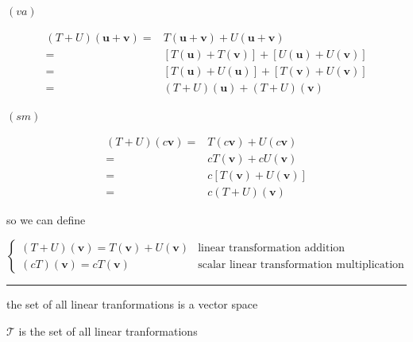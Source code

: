 \documentclass[
]{book}
\theoremstyle{definition}
\theoremstyle{definition}
\theoremstyle{definition}
\theoremstyle{definition}
\theoremstyle{remark}
\begin{document}
\(\left(va\right)\)

\[
\begin{aligned}
\left(T+U\right)\left(\boldsymbol{u}+\boldsymbol{v}\right)= & T\left(\boldsymbol{u}+\boldsymbol{v}\right)+U\left(\boldsymbol{u}+\boldsymbol{v}\right)\\
= & \left[T\left(\boldsymbol{u}\right)+T\left(\boldsymbol{v}\right)\right]+\left[U\left(\boldsymbol{u}\right)+U\left(\boldsymbol{v}\right)\right]\\
= & \left[T\left(\boldsymbol{u}\right)+U\left(\boldsymbol{u}\right)\right]+\left[T\left(\boldsymbol{v}\right)+U\left(\boldsymbol{v}\right)\right]\\
= & \left(T+U\right)\left(\boldsymbol{u}\right)+\left(T+U\right)\left(\boldsymbol{v}\right)
\end{aligned}
\]

\(\left(sm\right)\)

\[
\begin{aligned}
\left(T+U\right)\left(c\boldsymbol{v}\right)= & T\left(c\boldsymbol{v}\right)+U\left(c\boldsymbol{v}\right)\\
= & cT\left(\boldsymbol{v}\right)+cU\left(\boldsymbol{v}\right)\\
= & c\left[T\left(\boldsymbol{v}\right)+U\left(\boldsymbol{v}\right)\right]\\
= & c\left(T+U\right)\left(\boldsymbol{v}\right)
\end{aligned}
\]

so we can define

\[
\begin{cases}
\left(T+U\right)\left(\boldsymbol{v}\right)=T\left(\boldsymbol{v}\right)+U\left(\boldsymbol{v}\right) & \text{linear transformation addition}\\
\left(cT\right)\left(\boldsymbol{v}\right)=cT\left(\boldsymbol{v}\right) & \text{scalar linear transformation multiplication}
\end{cases}
\]

\begin{center}\rule{0.5\linewidth}{0.5pt}\end{center}

the set of all linear tranformations is a vector space

\(\mathcal{T}\) is the set of all linear tranformations
\end{document}
